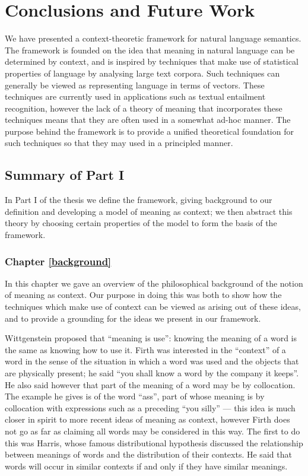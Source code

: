 
\chapter{Conclusions and Future Work}

We have presented a context-theoretic framework for natural language semantics. The framework is founded on the idea that meaning in natural language can be determined by context, and is inspired by techniques that make use of statistical properties of language by analysing large text corpora. Such techniques can generally be viewed as representing language in terms of vectors. These techniques are currently used in applications such as textual entailment recognition, however the lack of a theory of meaning that incorporates these techniques means that they are often used in a somewhat ad-hoc manner. The purpose behind the framework is to provide a unified theoretical foundation for such techniques so that they may used in a principled manner.

\section{Summary of Part I}

In Part I of the thesis we define the framework, giving background to our definition and developing a model of meaning as context; we then abstract this theory by choosing certain properties of the model to form the basis of the framework.

\subsection*{Chapter \ref{background}}

In this chapter we gave an overview of the philosophical background of the notion of meaning as context. Our purpose in doing this was both to show how the techniques which make use of context can be viewed as arising out of these ideas, and to provide a grounding for the ideas we present in our framework.

Wittgenstein proposed that ``meaning is use'': knowing the meaning of a word is the same as knowing how to use it. Firth was interested in the ``context'' of a word in the sense of the situation in which a word was used and the objects that are physically present; he said ``you shall know a word by the company it keeps''. He also said however that part of the meaning of a word may be by collocation. The example he gives is of the word ``ass'', part of whose meaning is by collocation with expressions such as a preceding ``you silly'' --- this idea is much closer in spirit to more recent ideas of meaning as context, however Firth does not go as far as claiming all words may be considered in this way. The first to do this was Harris, whose famous distributional hypothesis discussed the relationship between meanings of words and the distribution of their contexts. He said that words will occur in similar contexts if and only if they have similar meanings.

